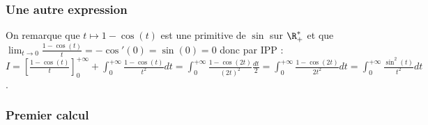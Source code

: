 \documentclass{book}
\begin{document}
	\subsubsection{Une autre expression }
	On remarque que $t\mapsto 1-\cos(t)$ est une primitive de $\sin$ sur $\R^*_+$ et que $\displaystyle\lim_{t\to 0}\frac{1-\cos(t)}{t}=-\cos'(0)=\sin(0)=0$ donc par IPP :\\
	$I=\displaystyle\left[\frac{1-\cos(t)}{t}\right]_0^{+\infty}+\int_0^{+\infty}\frac{1-\cos(t)}{t^2}dt=\int_0^{+\infty}\frac{1-\cos(2t)}{(2t)^2}\frac{dt}{2}=\int_0^{+\infty}\frac{1-\cos(2t)}{2t^2}dt=\int_0^{+\infty}\frac{\sin^2(t)}{t^2}dt$.
	
	\subsubsection{Premier calcul }
\end{document}

